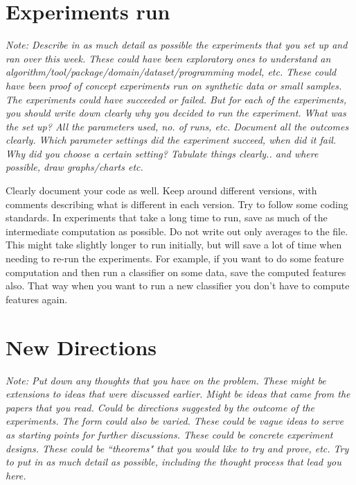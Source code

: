 \documentclass{article}
\begin{document}
\section{Experiments run}
{\it Note: Describe in as much detail as possible the experiments that you
set up and ran over this week. These could have been exploratory ones to
understand an algorithm/tool/package/domain/dataset/programming model, etc.
These could have been proof of concept experiments run on synthetic data or
small samples. The experiments could have succeeded or failed. But for each
of the experiments, you should write down clearly why you decided to run the
experiment. What was the set up? All the parameters used, no. of runs, etc.
Document all the outcomes clearly. Which parameter settings did the
experiment succeed, when did it fail. Why did you choose a certain setting?
Tabulate things clearly.. and where possible, draw graphs/charts etc.

Clearly document your code as well. Keep around different versions, with
comments describing what is different in each version. Try to follow some
coding standards. In experiments that take a long time to run, save as much
of the intermediate computation as possible. Do not write out only averages
to the file. This might take slightly longer to run initially, but will save
a lot of time when needing to re-run the experiments. For example, if you
want to do some feature computation and then run a classifier on some data,
save the computed features also. That way when you want to run a new
classifier you don't have to compute features again.}

\section{New Directions}

{\it Note: Put down any thoughts that you have on the problem. These might
be extensions to ideas that were discussed earlier. Might be ideas that came
from the papers that you read. Could be directions suggested by the outcome
of the experiments. The form could also be varied. These could be vague
ideas to serve as starting points for further discussions. These could be
concrete experiment designs. These could be ``theorems" that you would like
to try and prove, etc. Try to put in as much detail as possible, including
the thought process that lead you here. }
\end{document}
